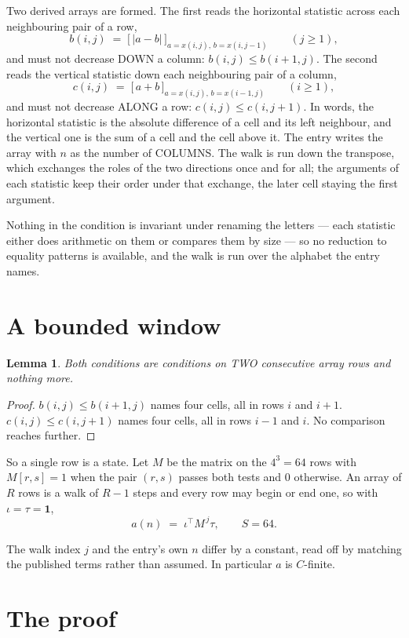 \documentclass[11pt,a4paper]{article}
\theoremstyle{plain}
\newtheorem{lemma}[theorem]{Lemma}
\theoremstyle{definition}
\begin{document}
Two derived arrays are formed. The first reads the horizontal statistic across each
neighbouring pair of a row,
\[
b(i,j)\;=\;\bigl[\,\lvert a-b\rvert\,\bigr]_{a=x(i,j),\,b=x(i,j-1)}\qquad (j\ge1),
\]
and must not decrease DOWN a column: $b(i,j)\le b(i{+}1,j)$. The second reads the vertical
statistic down each neighbouring pair of a column,
\[
c(i,j)\;=\;\bigl[\,a+b\,\bigr]_{a=x(i,j),\,b=x(i{-}1,j)}\qquad (i\ge1),
\]
and must not decrease ALONG a row: $c(i,j)\le c(i,j{+}1)$. In words, the horizontal statistic
is the absolute difference of a cell and its left neighbour, and the vertical one is
the sum of a cell and the cell above it. The entry writes the array with $n$ as the number of COLUMNS. The walk is run down the transpose, which exchanges the roles of the two directions once and for all; the arguments of each statistic keep their order under that exchange, the later cell staying the first argument.

Nothing in the condition is invariant under renaming the letters --- each statistic either does
arithmetic on them or compares them by size --- so no reduction to equality patterns is
available, and the walk is run over the alphabet the entry names.

\section{A bounded window}

\begin{lemma}\label{lem:win}
Both conditions are conditions on TWO consecutive array rows and nothing more.
\end{lemma}

\begin{proof}
$b(i,j)\le b(i{+}1,j)$ names four cells, all in rows $i$ and $i+1$. $c(i,j)\le c(i,j{+}1)$
names four cells, all in rows $i-1$ and $i$. No comparison reaches further.
\end{proof}

So a single row is a state. Let $M$ be the matrix on the $4^{3}=64$ rows with
$M[r,s]=1$ when the pair $(r,s)$ passes both tests and $0$ otherwise. An array of $R$ rows is a
walk of $R-1$ steps and every row may begin or end one, so with $\iota=\tau=\mathbf{1}$,
\[
a(n)\;=\;\iota^{\!\top}M^{\,j}\tau ,\qquad S=64.
\]

The walk index $j$ and the entry's own $n$ differ by a constant, read off by matching the
published terms rather than assumed. In particular $a$ is $C$-finite.

\section{The proof}
\end{document}
